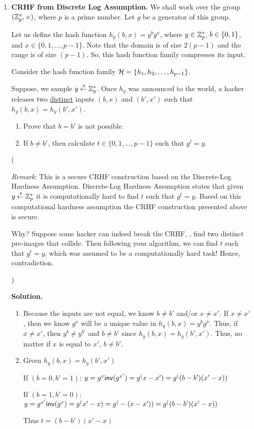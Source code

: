 \documentclass[11pt]{article}
\newcommand{\nextoddpage}{\checkoddpage\ifoddpage{\ \newpage\ \newpage}\else{\ \newpage}\fi}
\begin{document}
\begin{enumerate}
\nextoddpage 
\item {\bfseries CRHF from Discrete Log Assumption.} 
  We shall work over the group $({\mathbb Z}_p^*,\times)$, where $p$ is a prime number. 
  Let $g$ be a generator of this group. 
  
  Let us define the hash function $h_y (b,x) = y^b g^x$, where $y\in{\mathbb Z}_p^*$, $b\in{\{0,1\}}$, and $x\in\{0,1,\dotsc,p-1\}$. 
  Note that the domain is of size $2(p-1)$ and the range is of size $(p-1)$. 
  So, this hash function family compresses its input. 
  
  Consider the hash function family ${\mathcal H} = \{h_1,h_2,\dotsc,h_{p-1}\}$. 
  
  Suppose, we sample $y\mathbin{\stackrel{\mbox{\,\tiny \$}}{\gets}}{\mathbb Z}_p^*$.
  Once $h_y$ was announced to the world, a hacker releases two \underline{distinct} inputs $(b,x)$ and $(b',x')$ such that $h_y(b,x)=h_y(b',x')$. 
  
  \begin{enumerate}
  \item Prove that $b=b'$ is not possible. 
  \item If $b\neq b'$, then calculate $t\in\{0,1,\dotsc,p-1\}$ such that $g^t=y$. 
  \end{enumerate}
  
  ({\footnotesize{\em Remark}: This is a secure CRHF construction based on the Discrete-Log Hardness Assumption. Discrete-Log Hardness Assumption states that given $y\mathbin{\stackrel{\mbox{\,\tiny \$}}{\gets}}{\mathbb Z}_p^*$ it is computationally hard to find $t$ such that $g^t=y$. Based on this computational hardness assumption the CRHF construction presented above is secure. 
  
  Why? Suppose some hacker can indeed break the CRHF, \ie, find two distinct pre-images that collide. Then following your algorithm, we can find $t$ such that $g^t=y$, which was assumed to be a computationally hard task! Hence, contradiction.}) 

  {\bfseries Solution.} 
  \begin{enumerate}
  \item Because the inputs are not equal, we know $b \neq b'$ and/or $x \neq x'$. If $x \neq x'$, then we know $g^x$ will be a unique value in $h_y (b,x) = y^b g^x$. Thus, if $x \neq x'$, then $y^b \neq y^{b'}$ and $b \neq b'$ since $h_y(b,x) = h_y(b',x')$. Thus, no matter if $x$ is equal to $x'$, $b \neq b'$.
  \item Given $h_y(b,x)=h_y(b',x')$
 	
 	If $(b=0, b'=1)$: $y = g^x\mathsf{inv}(g^{x'}) = g^(x-x') = g^((b-b')(x'-x))$
 	
 	If $(b=1, b'=0)$: $y = g^{x'}\mathsf{inv}(g^x) = g^(x'-x) = g^(-(x-x')) = g^((b-b')(x'-x))$
 	
 	Thus $t = (b - b')(x' - x)$
  \end{enumerate}

 
 



\end{enumerate}
\end{document}
